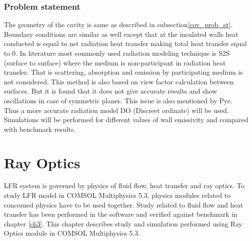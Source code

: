 \subsection{Problem statement}
The geometry of the cavity is same as described in subsection\ref{cov_prob_st}. Boundary conditions are similar as well except that at the insulated walls heat conducted is equal to net radiation heat transfer making total heat transfer equal to $0$. In literature most commonly used radiation modeling technique is S2S (surface to surface) where the medium is non-participant in radiation heat transfer. That is scattering, absorption and emission by participating medium is not considered. This method is also based on view factor calculation between surfaces. But it is found that it does not give accurate results and show oscillations in
case of symmetric planes. This issue is also mentioned by Pye\citep{pye2003modelling}. Thus a more accurate radiation model DO (Discreet ordinate) will be used. Simulations will be performed for different values of wall emissivity and compared with benchmark results.

\chapter{Ray Optics}\label{ch5}
LFR system is governed by physics of fluid flow, heat transfer and ray optics. To study LFR model in COMSOL Multiphysics 5.3, physics modules related to concerned physics have to be used together. Study related to fluid flow and heat transfer has been performed in the software and verified against benchmark in chapter \ref{ch3}. This chapter describes study and simulation performed using Ray Optics module in COMSOL Multiphysics 5.3.
